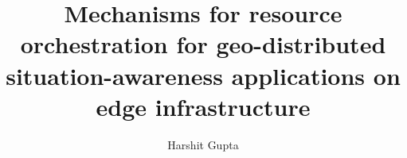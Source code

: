 \documentclass[12pt]{gatechthesis}
\title{Mechanisms for resource orchestration for geo-distributed situation-awareness applications on edge infrastructure}
\author{Harshit Gupta}
\begin{document}



\begin{frontmatter}
    
    \makeTOC
    \makeListOfTables
    \makeListOfFigures
    
    
\end{frontmatter}

\begin{thesisbody}
    
    \makeBibliography
\end{thesisbody}
\end{document}

